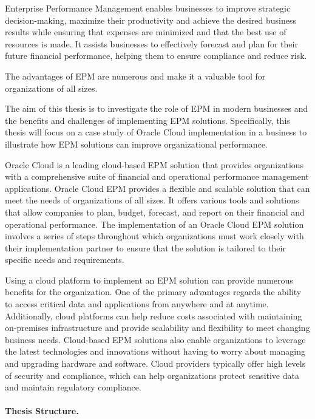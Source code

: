 \documentclass[12pt,a4paper,openright,twoside]{book}
\begin{document}
 Enterprise Performance Management enables businesses to improve strategic decision-making, maximize their productivity and achieve the desired business results while ensuring that expenses are minimized and that the best use of resources is made.
 It assists businesses to effectively forecast and plan for their future financial performance, helping them to ensure compliance and reduce risk. 
 
 The advantages of EPM are numerous and make it a valuable tool for organizations of all sizes.

 The aim of this thesis is to investigate the role of EPM in modern businesses and the benefits and challenges of implementing EPM solutions. 
 Specifically, this thesis will focus on a case study of Oracle Cloud implementation in a business to illustrate how EPM solutions can improve organizational performance. 
 
 Oracle Cloud is a leading cloud-based EPM solution that provides organizations with a comprehensive suite of financial and operational performance management applications.
Oracle Cloud EPM provides a flexible and scalable solution that can meet the needs of organizations of all sizes.
%
It offers various tools and solutions that allow companies to plan, budget, forecast, and report on their financial and operational performance.
%
The implementation of an Oracle Cloud EPM solution involves a series of steps throughout which organizations must work closely with their implementation partner to ensure that the solution is tailored to their specific needs and requirements.

Using a cloud platform to implement an EPM solution can provide numerous benefits for the organization. 
%
One of the primary advantages regards the ability to access critical data and applications from anywhere and at anytime.
%
Additionally, cloud platforms can help reduce costs associated with maintaining on-premises infrastructure and provide scalability and flexibility to meet changing business needs. 
%
Cloud-based EPM solutions also enable organizations to leverage the latest technologies and innovations without having to worry about managing and upgrading hardware and software. 
%
Cloud providers typically offer high levels of security and compliance, which can help organizations protect sensitive data and maintain regulatory compliance. 

%
\paragraph{Thesis Structure.}
%
\end{document}
